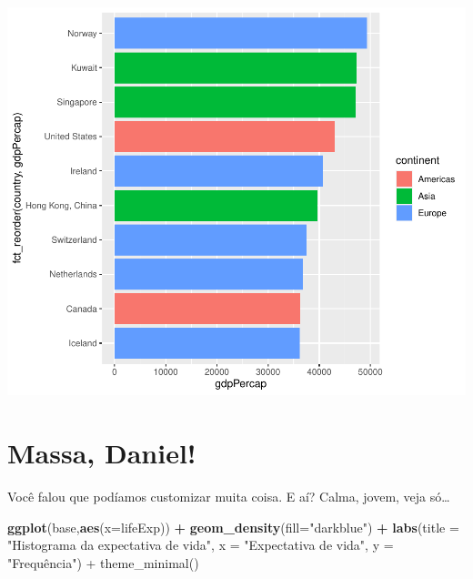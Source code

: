 \documentclass[
]{article}
\newenvironment{Shaded}{\begin{snugshade}}{\end{snugshade}}
\newcommand{\DataTypeTok}[1]{\textcolor[rgb]{0.13,0.29,0.53}{#1}}
\newcommand{\KeywordTok}[1]{\textcolor[rgb]{0.13,0.29,0.53}{\textbf{#1}}}
\newcommand{\NormalTok}[1]{#1}
\newcommand{\OperatorTok}[1]{\textcolor[rgb]{0.81,0.36,0.00}{\textbf{#1}}}
\newcommand{\StringTok}[1]{\textcolor[rgb]{0.31,0.60,0.02}{#1}}
\begin{document}
\begin{center}\includegraphics{arquivo_pdf_files/figure-latex/densidade_customizada2-1} \end{center}

\hypertarget{massa-daniel}{%
\section{Massa, Daniel!}\label{massa-daniel}}

Você falou que podíamos customizar muita coisa. E aí? Calma, jovem, veja
só\ldots{}

\begin{Shaded}
\begin{Highlighting}[]
\KeywordTok{ggplot}\NormalTok{(base,}\KeywordTok{aes}\NormalTok{(}\DataTypeTok{x=}\NormalTok{lifeExp)) }\OperatorTok{+}\StringTok{ }\KeywordTok{geom_density}\NormalTok{(}\DataTypeTok{fill=}\StringTok{"darkblue"}\NormalTok{) }\OperatorTok{+}
\StringTok{  }\KeywordTok{labs}\NormalTok{(}\DataTypeTok{title =} \StringTok{"Histograma da expectativa de vida"}\NormalTok{, }
       \DataTypeTok{x =} \StringTok{"Expectativa de vida"}\NormalTok{, }\DataTypeTok{y =} \StringTok{"Frequência") + theme_minimal()}
\end{Highlighting}
\end{Shaded}
\end{document}
